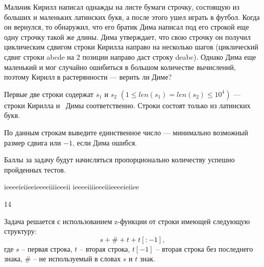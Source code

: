 
Мальчик Кирилл написал однажды на листе бумаги строчку, состоящую из больших и маленьких 
латинских букв, а после этого ушел играть в футбол. Когда он вернулся, то обнаружил, 
что его братик Дима написал под его строкой еще одну строчку такой же длины. 
Дима утверждает, что свою строчку он получил циклическим сдвигом строки Кирилла 
направо на несколько шагов (циклический сдвиг строки abcde на 2 позиции направо 
даст строку deabc). Однако Дима еще маленький и мог случайно ошибиться в большом 
количестве вычислений, поэтому Кирилл в растерянности — верить ли Диме?


Первые две строки содержат $s_1$ и $s_2$ $(1\leq len(s_1) = len(s_2) \leq 10^4)$ — строки Кирилла и \
Димы соответственно. Строки состоят только из латинских букв.

\outputfmtSection

По данным строкам выведите единственное число — минимально возможный размер сдвига или $ -1 $, если Дима ошибся.

\markSection

Баллы за задачу будут начисляться пропорционально количеству успешно пройденных тестов.


\begin{myverbbox}[\small]{\vinput}
    ieeeeieiieeieeeeiiiieeeii
    ieeeeiiiieeeiiieeeeieiiee
\end{myverbbox}

\begin{myverbbox}[\small]{\voutput}
    14
\end{myverbbox}

\solutionSection

Задача решается с использованием z-функции от строки имеющей следующую структуру:
$$s + \# + t + t[:-1],$$ 
где $s$ -- первая строка, $t$ -- вторая строка, $t[-1]$ -- вторая строка без последнего знака, $\#$ -- не используемый в словах $s$ и $t$ знак. 

